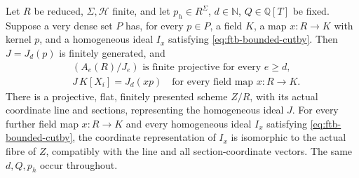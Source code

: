 \begin{srproposition}
\label{prop:ftb-flat-projective-from-bounded-forms}
Let \(R\) be reduced, \(\Sigma,\mathcal H\) finite, and
let \(p_h\in R^\Sigma\), \(d\in\mathbb N\),
\(Q\in\mathbb Q[T]\) be fixed.
Suppose a very dense set \(P\) has, for every \(p\in P\),
a field \(K\), a map \(x:R\to K\) with kernel \(p\), and
a homogeneous ideal \(I_x\) satisfying
\eqref{eq:ftb-bounded-cutby}.
Then \(J=J_d(p)\) is finitely generated, and
\[
 \begin{split}
 &(A_e(R)/J_e)\text{ is finite projective for every }e\ge d,\\
 &J\,K[X_i]=J_d(xp)\quad\text{for every field map }x:R\to K.
 \end{split}
 \tag{M9}\label{eq:ftb-bounded-form-projectivity}
\]
There is a projective, flat, finitely presented scheme
\(Z/R\), with its actual coordinate line and sections,
representing the homogeneous ideal \(J\).
For every further field map \(x:R\to K\) and every homogeneous
ideal \(I_x\) satisfying \eqref{eq:ftb-bounded-cutby}, the
coordinate representation of \(I_x\) is isomorphic to the
actual fibre of \(Z\), compatibly with the line and all
section-coordinate vectors.
The same \(d,Q,p_h\) occur throughout.
\end{srproposition}
